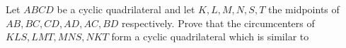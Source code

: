 Let $ABCD$ be a cyclic quadrilateral and let $K,L,M,N,S,T$ the midpoints of $AB, BC, CD, AD, AC, BD$ respectively.  Prove that the circumcenters of $KLS, LMT, MNS, NKT$ form a cyclic quadrilateral which is similar to 